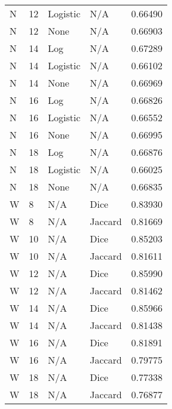 \documentclass{article}
\begin{document}
\begin{center}
\begin{supertabular}{| l | l | l | l | l |}
            N & 12 & Logistic & N/A & 0.66490 \\
            N & 12 & None & N/A & 0.66903 \\
            N & 14 & Log & N/A & 0.67289 \\
            N & 14 & Logistic & N/A & 0.66102 \\
            N & 14 & None & N/A & 0.66969 \\
            N & 16 & Log & N/A & 0.66826 \\
            N & 16 & Logistic & N/A & 0.66552 \\
            N & 16 & None & N/A & 0.66995 \\
            N & 18 & Log & N/A & 0.66876 \\
            N & 18 & Logistic & N/A & 0.66025 \\
            N & 18 & None & N/A & 0.66835 \\
            W & 8 & N/A & Dice & 0.83930 \\
            W & 8 & N/A & Jaccard & 0.81669 \\
            W & 10 & N/A & Dice & 0.85203 \\
            W & 10 & N/A & Jaccard & 0.81611 \\
            W & 12 & N/A & Dice & 0.85990 \\
            W & 12 & N/A & Jaccard & 0.81462 \\
            W & 14 & N/A & Dice & 0.85966 \\
            W & 14 & N/A & Jaccard & 0.81438 \\
            W & 16 & N/A & Dice & 0.81891 \\
            W & 16 & N/A & Jaccard & 0.79775 \\
            W & 18 & N/A & Dice & 0.77338 \\
            W & 18 & N/A & Jaccard & 0.76877 \\
      \end{supertabular}
\end{center}
\end{document}
